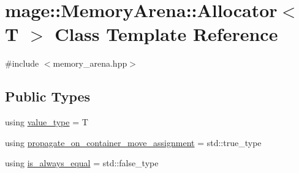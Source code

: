 \hypertarget{classmage_1_1_memory_arena_1_1_allocator}{}\section{mage\+:\+:Memory\+Arena\+:\+:Allocator$<$ T $>$ Class Template Reference}
\label{classmage_1_1_memory_arena_1_1_allocator}


{\ttfamily \#include $<$memory\+\_\+arena.\+hpp$>$}

\subsection*{Public Types}
\begin{DoxyCompactItemize}
\item 
using \mbox{\hyperlink{classmage_1_1_memory_arena_1_1_allocator_a216e8ae017f9cfeb1676839da11a1b5c}{value\+\_\+type}} = T
\item 
using \mbox{\hyperlink{classmage_1_1_memory_arena_1_1_allocator_a00a438b50f33f4c7b68a20c994e6fc4b}{propagate\+\_\+on\+\_\+container\+\_\+move\+\_\+assignment}} = std\+::true\+\_\+type
\item 
using \mbox{\hyperlink{classmage_1_1_memory_arena_1_1_allocator_a5f25626106f2f21d37b75b271f230ae4}{is\+\_\+always\+\_\+equal}} = std\+::false\+\_\+type
\end{DoxyCompactItemize}
